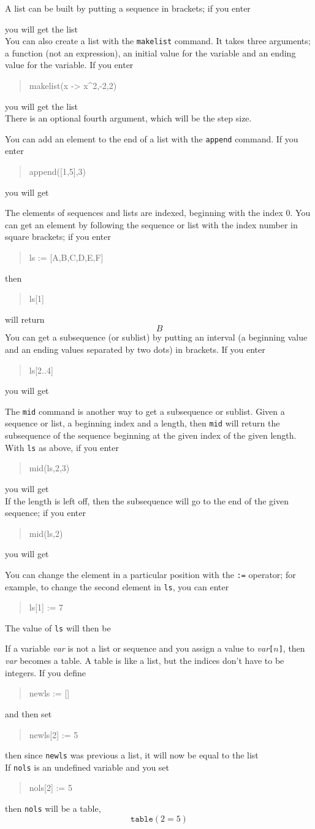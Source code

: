 \documentclass{article}
\newcommand{\xcasin}[1]
{\begin{quote}\ttfamily
#1
\end{quote}}
\newcommand{\xcasout}[1]
{\begin{equation*}
#1
\end{equation*}}
\begin{document}
A list can be built by putting a sequence in brackets; if you enter
\xcasin{[k\^{}3,k=1..3]}
you will get the list
\xcasout{[1,8,27]}
You can also create a list with the \texttt{makelist} command.  It
takes three arguments; a function (not an expression), an initial
value for the variable and an ending value for the variable.  If you
enter
\xcasin{makelist(x -> x\^{}2,-2,2)}
you will get the list
\xcasout{[4,1,0,1,4]}
There is an optional fourth argument, which will be the step size.

You can add an element to the end of a list with the \texttt{append}
command.  If you enter
\xcasin{append([1,5],3)}
you will get
\xcasout{[1,5,3]}

The elements of sequences and lists are indexed, beginning with the
index $0$.  You can get an element by following the sequence or
list with the index number in square brackets; if you enter
\xcasin{ls := [A,B,C,D,E,F]}
then
\xcasin{ls[1]}
will return
\xcasout{B}
You can get a subsequence (or sublist) 
by putting an interval (a
beginning value and an ending values separated by two dots) in brackets.
If you enter
\xcasin{ls[2..4]}
you will get 
\xcasout{[C,D,E]}

The \texttt{mid} command is another
way to get a subsequence or sublist. 
Given a sequence or list, a beginning index and a length, then
\texttt{mid} will return the subsequence of the sequence beginning at
the given index of the given length.  With \texttt{ls} as above,  if
you enter
\xcasin{mid(ls,2,3)}
you will get
\xcasout{[C,D,E]}
If the length is left off, then the subsequence will go to the end of
the given sequence; if you enter
\xcasin{mid(ls,2)}
you will get
\xcasout{[C,D,E,F]}


You can change the element in a particular position with the
\texttt{:=} operator; for example, to change the second element in
\texttt{ls}, you can enter
\xcasin{ls[1] := 7}
The value of \texttt{ls} will then be
\xcasout{[A,7,C,D,E,F]}

If a variable \textit{var} is not a list or sequence and you assign a
value to \textit{var}\texttt{[$n$]}, then \textit{var} becomes a
table.  A table is like a list, but the indices don't have to be
integers.  If you define
\xcasin{newls := []}
and then set
\xcasin{newls[2] := 5}
then since \texttt{newls} was previous a list, it will now be equal to
the list
\xcasout{[0,0,5]}
If \texttt{nols} is an undefined variable and you set
\xcasin{nols[2] := 5}
then \texttt{nols} will be a table,
\xcasout{\texttt{table}(2=5)}
\end{document}
